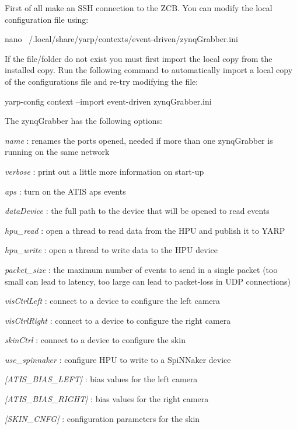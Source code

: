 First of all make an S\+SH connection to the Z\+CB. You can modify the local configuration file using\+: 
\begin{DoxyCode}
nano ~/.local/share/yarp/contexts/event-driven/zynqGrabber.ini
\end{DoxyCode}
 If the file/folder do not exist you must first import the local copy from the installed copy. Run the following command to automatically import a local copy of the configurations file and re-\/try modifying the file\+: 
\begin{DoxyCode}
yarp-config context --import event-driven zynqGrabber.ini
\end{DoxyCode}
 The {\ttfamily zynq\+Grabber} has the following options\+:
\begin{DoxyItemize}
\item {\itshape name} \+: renames the ports opened, needed if more than one zynq\+Grabber is running on the same network
\item {\itshape verbose} \+: print out a little more information on start-\/up
\item {\itshape aps} \+: turn on the A\+T\+IS aps events
\item {\itshape data\+Device} \+: the full path to the device that will be opened to read events
\item {\itshape hpu\+\_\+read} \+: open a thread to read data from the H\+PU and publish it to {\ttfamily Y\+A\+RP}
\item {\itshape hpu\+\_\+write} \+: open a thread to write data to the H\+PU device
\item {\itshape packet\+\_\+size} \+: the maximum number of events to send in a single packet (too small can lead to latency, too large can lead to packet-\/loss in U\+DP connections)
\item {\itshape vis\+Ctrl\+Left} \+: connect to a device to configure the left camera
\item {\itshape vis\+Ctrl\+Right} \+: connect to a device to configure the right camera
\item {\itshape skin\+Ctrl} \+: connect to a device to configure the skin
\item {\itshape use\+\_\+spinnaker} \+: configure H\+PU to write to a Spi\+N\+Naker device
\item {\itshape \mbox{[}A\+T\+I\+S\+\_\+\+B\+I\+A\+S\+\_\+\+L\+E\+FT\mbox{]}} \+: bias values for the left camera
\item {\itshape \mbox{[}A\+T\+I\+S\+\_\+\+B\+I\+A\+S\+\_\+\+R\+I\+G\+HT\mbox{]}} \+: bias values for the right camera
\item {\itshape \mbox{[}S\+K\+I\+N\+\_\+\+C\+N\+FG\mbox{]}} \+: configuration parameters for the skin
\end{DoxyItemize}

